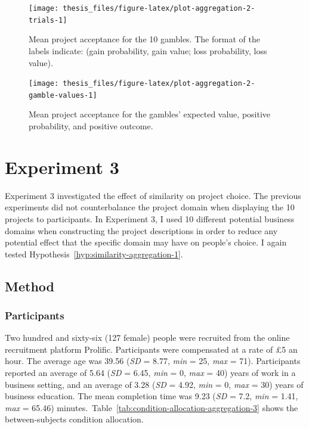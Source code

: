 \documentclass[a4paper, nobind, dvipsnames]{templates/ociamthesis}
\theoremstyle{definition}
\theoremstyle{definition}
\theoremstyle{definition}
\theoremstyle{definition}
\theoremstyle{remark}
\begin{document}
\begin{figure}
\texttt{[image: thesis\_files/figure-latex/plot-aggregation-2-trials-1]} \caption{Mean project acceptance for the 10 gambles. The format of the labels indicate: (gain probability, gain value; loss probability, loss value).}\label{fig:plot-aggregation-2-trials}
\end{figure}



\begin{figure}
\texttt{[image: thesis\_files/figure-latex/plot-aggregation-2-gamble-values-1]} \caption{Mean project acceptance for the gambles' expected value, positive probability, and positive outcome.}\label{fig:plot-aggregation-2-gamble-values}
\end{figure}

\hypertarget{aggregation-3}{%
\section{Experiment 3}\label{aggregation-3}}

Experiment 3 investigated the effect of similarity on project choice. The
previous experiments did not counterbalance the project domain when displaying
the 10 projects to participants. In Experiment 3, I used 10 different potential
business domains when constructing the project descriptions in order to reduce
any potential effect that the specific domain may have on people's choice. I
again tested Hypothesis~\ref{hyp:similarity-aggregation-1}.

\subsection{Method}

\subsubsection{Participants}

Two hundred and sixty-six (127 female) people were recruited from the online recruitment platform Prolific. Participants were compensated at a rate of £5 an hour. The average age was 39.56 (\emph{SD} = 8.77, \emph{min} = 25, \emph{max} = 71). Participants reported an average of 5.64 (\emph{SD} = 6.45, \emph{min} = 0, \emph{max} = 40) years of work in a business setting, and an average of 3.28 (\emph{SD} = 4.92, \emph{min} = 0, \emph{max} = 30) years of business education. The mean completion time was 9.23 (\emph{SD} = 7.2, \emph{min} = 1.41, \emph{max} = 65.46) minutes.~Table~\ref{tab:condition-allocation-aggregation-3}
shows the between-subjects condition allocation.
\end{document}
